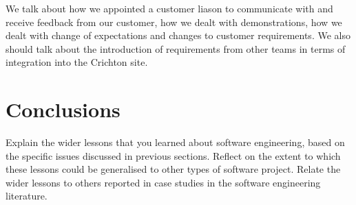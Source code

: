 \documentclass{l3proj}
\begin{document}
We talk about how we appointed a customer liason to communicate with and receive feedback from our customer, how we dealt with
demonstrations, how we dealt with change of expectations and changes to customer requirements. We also should talk about the
introduction of requirements from other teams in terms of integration into the Crichton site.


\section{Conclusions}

Explain the wider lessons that you learned about software engineering,
based on the specific issues discussed in previous sections.  Reflect
on the extent to which these lessons could be generalised to other
types of software project.  Relate the wider lessons to others
reported in case studies in the software engineering literature.



\end{document}

